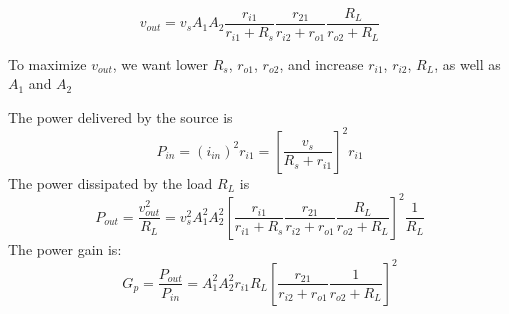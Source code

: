 \usepackage{html}




  \[ v_{out}=v_s A_1 A_2\frac{r_{i1}}{r_{i1}+R_s}\frac{r_{21}}{r_{i2}+r_{o1}}\frac{R_L}{r_{o2}+R_L} \]
      
  To maximize $v_{out}$, we want lower $R_s$, $r_{o1}$, $r_{o2}$, and increase
  $r_{i1}$, $r_{i2}$, $R_L$, as well as $A_1$ and $A_2$
  
  The power delivered by the source is
  \[ P_{in}=(i_{in})^2 r_{i1}=[\frac{v_s}{R_s+r_{i1}}]^2 r_{i1} \]
  The power dissipated by the load $R_L$ is
  \[ P_{out}=\frac{v_{out}^2}{R_L}=
  v^2_s A^2_1 A^2_2[\frac{r_{i1}}{r_{i1}+R_s}\frac{r_{21}}{r_{i2}+r_{o1}}\frac{R_L}{r_{o2}+R_L}]^2 \frac{1}{R_L}\]
  The power gain is:
  \[ G_p=\frac{P_{out}}{P_{in}}=A^2_1A^2_2 r_{i1}R_L
  [\frac{r_{21}}{r_{i2}+r_{o1}}\frac{1}{r_{o2}+R_L}]^2 \]
  



